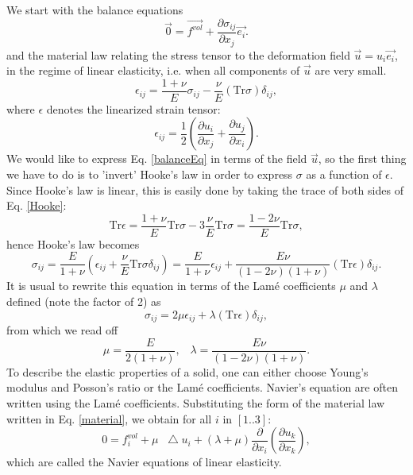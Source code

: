 \documentclass[DIV=12]{article}
\newcommand*\Laplace{\mathop{}\!\mathbin\bigtriangleup}
\newcommand{\fVol}{\vec{f^{vol}}}
\newcommand{\Tr}{\mathrm{Tr}}
\begin{document}
We start with the balance equations
\begin{equation}
\vec{0} = \fVol + \frac{\partial \sigma_{ij}}{ \partial x_j} \vec{e_i}.
 \label{balanceEq}
\end{equation}
and the material law relating the stress tensor to the deformation field $\vec{u} = u_i \vec{e_i}$,
 in the regime of linear elasticity, i.e. when all components of $\vec{u}$ are very small.
\begin{equation}   
 \epsilon_{ij} = \frac{1 + \nu}{E } \sigma_{ij} - \frac{\nu}{E} (\Tr \sigma ) \delta_{ij},
\end{equation}
 where $\epsilon$ denotes the linearized strain tensor:
\begin{equation}
\epsilon_{ij} = \frac{1}{2} \left(  \frac{\partial u_i}{\partial x_j} + \frac{\partial u_j}{\partial x_i} \right).
 \label{Hooke}
\end{equation}
We would like to express Eq. \ref{balanceEq} in terms of the field $\vec{u}$, so the first thing we have
 to do is to 'invert' Hooke's law in order to express $\sigma$ as a function of $\epsilon$. Since Hooke's 
 law is linear, this is easily done by taking the trace of both sides of Eq. \ref{Hooke}:\\
\begin{equation}
\Tr \epsilon = \frac{1+\nu}{E} \Tr \sigma - 3 \frac{\nu}{E} \Tr \sigma = \frac{1-2\nu}{ E } \Tr \sigma,
\end{equation}
 hence Hooke's law becomes
 \begin{equation}
  \sigma_{ij} = \frac{E}{1+\nu}\left(  \epsilon_{ij} + \frac{\nu}{ E} \Tr \sigma \delta_{ij}\right) =  \frac{E}{1+\nu} \epsilon_{ij}   + \frac{E\nu}{(1-2\nu)(1+\nu)}(\Tr \epsilon)\delta_{ij}.
\end{equation}
 It is usual to rewrite this equation in terms of the Lam\'e coefficients $\mu$ and $\lambda$ defined (note the factor of 2) as 
 \begin{equation}
  \sigma_{ij} = 2\mu \epsilon_{ij}+ \lambda (\Tr\epsilon) \delta_{ij},
 \label{material}
 \end{equation}
from which we read off 
 \begin{equation}
\boxed{
 \mu =   \frac{E}{2( 1+\nu)},\;\;\; \lambda =   \frac{E\nu}{(1-2\nu)(1+\nu)}.
}
\end{equation}
To describe the elastic properties of a solid, one can either choose Young's modulus and Posson's ratio 
 or the Lam\'e coefficients. Navier's equation are often written using the Lam\'e coefficients. Substituting the  
 form of the material law written in Eq. \ref{material}, we obtain for all $i$ in $[1..3]$:\\
\begin{equation}
0 = f^{vol}_i + \mu \Laplace u_i + (\lambda+ \mu) \frac{\partial}{\partial x_i}\left( \frac{\partial u_k}{\partial x_k} \right),
\end{equation}
 which are called the Navier equations of linear elasticity.
\end{document}
